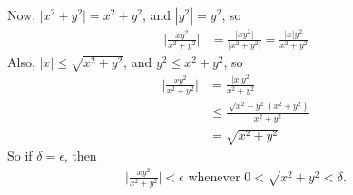 Now, $\big| x^2 + y^2\big| = x^2 + y^2$, and $|y^2| = y^2$, so
\begin{align*}
 \Big|  \frac{xy^2}{x^2+y^2} \Big| &=  \frac{ \big|xy^2 \big|}{ \big|x^2+y^2 \big|}  =   \frac{ \big|x\big|y^2 }{ x^2+y^2 }
\end{align*}
Also, $|x| \le \sqrt{x^2+y^2}$, and $y^2 \le x^2+y^2$, so
\begin{align*}
 \Big|  \frac{xy^2}{x^2+y^2} \Big| 
 &=  \frac{ \big|x\big|y^2 }{ x^2+y^2 }\\
 &\le \frac{ \ \sqrt{x^2+y^2} ( x^2+y^2 ) }{ x^2+y^2 }\\
 &= \sqrt{x^2+y^2}
\end{align*}
So if $\delta = \epsilon$, then 
\begin{align*}
 \Big|  \frac{xy^2}{x^2+y^2} \Big| < \epsilon \text{  whenever  } 0 < \sqrt{x^2 + y^2} < \delta .
\end{align*}

\EEN
